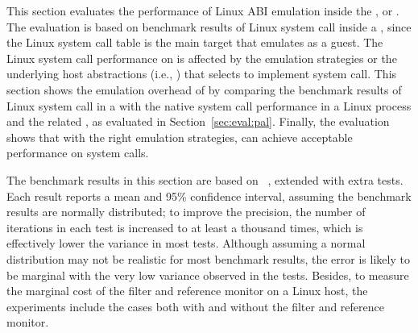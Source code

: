 This section evaluates the performance
of Linux ABI emulation
inside the \graphene{} \libos{},
or \thelibos{}.
The evaluation is based on benchmark results
of Linux system call inside a \picoproc{},
since the Linux system call table is the main target that \thelibos{} emulates
as a guest.
The Linux system call performance
on \thelibos{}
is affected by the emulation strategies
or the underlying host abstractions (i.e., \hostapis{})
that \thelibos{}
selects to implement system call.
This section
shows the emulation overhead of \thelibos{}
by comparing the benchmark results
of Linux system call in a \picoproc{} with the native system call performance in a Linux process
and the related \hostapis{}, as evaluated in Section~\ref{sec:eval:pal}.
Finally,
the evaluation shows that with the right emulation strategies,
\thelibos{} can achieve acceptable performance on system calls.


The benchmark results in this section are based on
\lmbenchwithver{}~\cite{McVoy:lmbench},
extended with extra tests.
Each result
reports a mean and 95\% confidence interval,
assuming the benchmark results are normally distributed;
to improve the precision,
the number of iterations in each test is increased to at least a thousand times, which is effectively lower the variance
in most tests.
Although assuming a normal distribution may not be realistic for most benchmark results,
the error is likely to be marginal with the very low variance
observed in the tests.
Besides, to measure the marginal cost of the \seccomp{} filter and reference monitor on a Linux host,
the experiments include the cases both with
and without the \seccomp{} filter and reference monitor.


